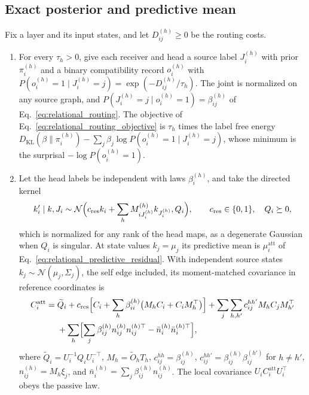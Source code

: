 \documentclass[twoside,11pt]{article}
\begin{document}
\subsection{Exact posterior and predictive mean}
\label{sec:exact_posterior}

\begin{theorem}
\label{thm:probabilistic_status}
Fix a layer and its input states, and let $D_{ij}^{(h)}\ge0$ be the routing costs.
\begin{enumerate}
\item For every $\tau_h>0$, give each receiver and head a source label $J_i^{(h)}$ with prior $\pi_i^{(h)}$ and a binary compatibility record $o_i^{(h)}$ with $P(o_i^{(h)}=1\mid J_i^{(h)}=j)=\exp(-D_{ij}^{(h)}/\tau_h)$. The joint is normalized on any source graph, and $P(J_i^{(h)}=j\mid o_i^{(h)}=1)=\beta_{ij}^{(h)}$ of Eq.~\eqref{eq:relational_routing}. The objective of Eq.~\eqref{eq:relational_routing_objective} is $\tau_h$ times the label free energy $D_{\mathrm{KL}}(\beta\|\pi_i^{(h)})-\sum_j\beta_j\log P(o_i^{(h)}=1\mid J_i^{(h)}=j)$, whose minimum is the surprisal $-\log P(o_i^{(h)}=1)$.
\item Let the head labels be independent with laws $\beta_i^{(h)}$, and take the directed kernel
\begin{equation}
k_i'\mid k,J_i\sim\mathcal N\Bigl(c_{\mathrm{res}}k_i+\sum_hM_{iJ_i^{(h)}}^{(h)}k_{J_i^{(h)}},Q_i\Bigr),\qquad c_{\mathrm{res}}\in\{0,1\},\quad Q_i\succeq0,
\label{eq:predictive_kernel}
\end{equation}
which is normalized for any rank of the head maps, as a degenerate Gaussian when $Q_i$ is singular. At state values $k_j=\mu_j$ its predictive mean is $\mu_i^{\mathrm{att}}$ of Eq.~\eqref{eq:relational_predictive_residual}. With independent source states $k_j\sim\mathcal N(\mu_j,\Sigma_j)$, the self edge included, its moment-matched covariance in reference coordinates is
\begin{equation}
\begin{aligned}
C_i^{\mathrm{att}}={}&\widetilde Q_i+c_{\mathrm{res}}\Bigl[C_i+\sum_h\beta_{ii}^{(h)}\bigl(M_hC_i+C_iM_h^\top\bigr)\Bigr]
+\sum_j\sum_{h,h'}c_{ij}^{hh'}M_hC_jM_{h'}^\top\\
&+\sum_h\Bigl[\sum_j\beta_{ij}^{(h)}n_{ij}^{(h)}n_{ij}^{(h)\top}-\bar n_i^{(h)}\bar n_i^{(h)\top}\Bigr],
\end{aligned}
\label{eq:predictive_kernel_covariance}
\end{equation}
where $\widetilde Q_i=U_i^{-1}Q_iU_i^{-\top}$, $M_h=\widetilde O_hT_h$, $c_{ij}^{hh}=\beta_{ij}^{(h)}$, $c_{ij}^{hh'}=\beta_{ij}^{(h)}\beta_{ij}^{(h')}$ for $h\ne h'$, $n_{ij}^{(h)}=M_h\xi_j$, and $\bar n_i^{(h)}=\sum_j\beta_{ij}^{(h)}n_{ij}^{(h)}$. The local covariance $U_iC_i^{\mathrm{att}}U_i^\top$ obeys the passive law.
\end{enumerate}
\end{theorem}
\end{document}
